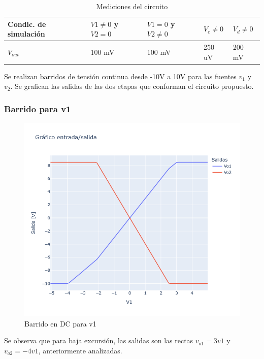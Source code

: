 \begin{table}[H]
\centering
\begin{tabular}{ | m{2cm} | m{2cm}| m{2cm} | m{2cm} | m{2cm} | } 
  \hline
  Condic. de simulación & $V1 \neq 0$ y $V2 = 0$ & $V1 = 0$ y $V2 \neq 0$ & $V_c \neq 0$ & $V_d \neq 0$ \\ 
  \hline
  $V_{out}$ & 100 mV & 100 mV & 250 uV & 200 mV \\ 
  \hline
\end{tabular}
\caption{Mediciones del circuito}
\end{table}

Se realizan barridos de tensión continua desde -10V a 10V para las fuentes \(v_1\) y \(v_2\). Se grafican las salidas de las dos etapas que conforman el circuito propuesto.

\subsubsection{Barrido para v1}

\begin{figure}[h!]
    \centering
    \includegraphics[width=0.7\linewidth]{Secciones/Circuito1/Vo1_Vo2_vs_V1.png}
    
    \caption{Barrido en DC para v1}
\end{figure}

Se observa que para baja excursión, las salidas son las rectas \(v_{o1}= 3v1\) y \(v_{o2}= -4v1\), anteriormente analizadas.

